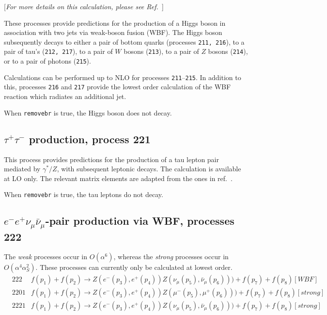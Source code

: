 \begin{center}
[{\it For more details on this calculation, please see Ref.~\cite{Berger:2004pca}}]
\end{center}

These processes provide predictions for the production of a Higgs boson in
association with two jets via weak-boson fusion (WBF). The Higgs boson
subsequently decays to either a pair of bottom quarks
(processes {\tt 211, 216}), to a pair of tau's ({\tt 212, 217}), 
to a pair of $W$ bosons ({\tt 213}),
to a pair of $Z$ bosons ({\tt 214}),
or to a pair of photons ({\tt 215}).

Calculations can be performed up to NLO for processes {\tt 211}--{\tt 215}.
In addition to this, processes {\tt 216} and {\tt 217} provide the lowest
order calculation of the WBF reaction which radiates an additional jet. 

When {\tt removebr} is true, the Higgs boson does not decay.

\subsection{$\tau^+\tau^-$ production, process 221}
\label{subsec:tautau}

This process provides predictions for the production of a tau lepton
pair mediated by $\gamma^*/Z$, with subsequent leptonic decays. The calculation is available at LO
only. The relevant matrix elements are adapted from the ones in
ref.~\cite{Kleiss:1988xr}.

When {\tt removebr} is true, the tau leptons do not decay.


%
\subsection{$e^-e^+ \nu_{\mu} \bar\nu_{\mu} $-pair production via WBF, processes 222}
The {\it weak} processes occur in $O(\alpha^6)$, whereas the {\it strong} processes occur in $O(\alpha^4 \alpha_S^2)$.
These processes can currently only be calculated at lowest order.
\begin{eqnarray}
&222 &  f(p_1)+f(p_2) \to Z(e^-(p_3),e^+(p_4))Z(\nu_\mu(p_5),\bar{\nu}_\mu(p_6)))+f(p_7)+f(p_8) [WBF]  \nonumber \\
&2201 & f(p_1)+f(p_2) \to Z(e^-(p_3),e^+(p_4))Z(\mu^-(p_5),\mu^+(p_6)))+f(p_7)+f(p_8) [strong] \nonumber \\
&2221 & f(p_1)+f(p_2) \to Z(e^-(p_3),e^+(p_4))Z(\nu_\mu(p_5),\bar{\nu}_\mu(p_6)))+f(p_7)+f(p_8) [strong]  \nonumber
\end{eqnarray}
%
